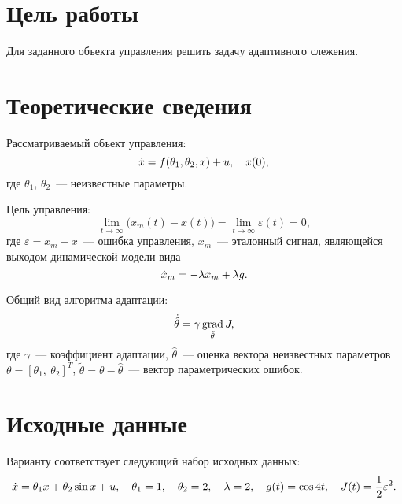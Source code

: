 \section{Цель работы}
Для заданного объекта управления решить задачу адаптивного слежения.



\section{Теоретические сведения}
Рассматриваемый объект управления:
\begin{equation}
    \dot{x} = f(\theta_1, \theta_2, x) + u, \quad x(0), \\
\end{equation}
где $\theta_1$, $\theta_2$~--- неизвестные параметры.

Цель управления:
\begin{equation}
    \lim_{t \rightarrow \infty } \bigl( x_m(t) - x(t) \bigr) = \lim_{t \rightarrow \infty } \varepsilon(t) = 0,
\end{equation}
где $\varepsilon = x_m - x$~--- ошибка управления, $x_m$~--- эталонный сигнал, являющейся выходом динамической модели вида
\begin{equation}
    \dot{x}_m = -\lambda x_m + \lambda g \ldotp
\end{equation}

Общий вид алгоритма адаптации:
\begin{equation}
    \dot{\hat{\theta}} = \gamma \operatorname*{grad}_{\tilde\theta} J,
\end{equation}
где $\gamma$~--- коэффициент адаптации, $\hat{\theta}$~--- оценка вектора неизвестных параметров $\theta = [ \theta_1, \: \theta_2 ]^T$, $\tilde{\theta} = \theta - \hat{\theta}$~--- вектор параметрических ошибок.

\section{Исходные данные}
Варианту  соответствует следующий набор исходных данных:
\begin{equation}
    \dot{x} = \theta_1 x + \theta_2 \sin{x} + u,
    \quad
    \theta_1 = 1,
    \quad
    \theta_2 = 2,
    \quad
    \lambda = 2,
    \quad
    g(t) = \cos 4t,
    \quad
    J(t) = \frac{1}{2} \varepsilon^2 \ldotp
\end{equation}



